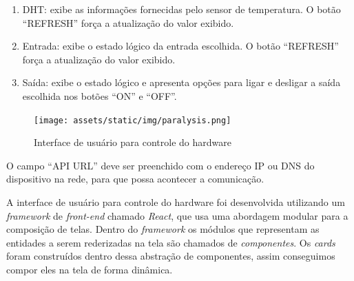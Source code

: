 \documentclass[../../layout.tex]{subfiles}
\begin{document}
\begin{enumerate}[label=\alph*)]
\itemsep0em
	\item DHT: exibe as informações fornecidas pelo sensor de temperatura. O botão ``REFRESH'' força a atualização do valor exibido.
	\item Entrada: exibe o estado lógico da entrada escolhida. O botão ``REFRESH'' força a atualização do valor exibido.
	\item Saída: exibe o estado lógico e apresenta opções para ligar e desligar a saída escolhida nos botões ``ON'' e ``OFF''.
\end{enumerate}

\begin{figure}[H]
\centering
\caption{Interface de usuário para controle do hardware}
\texttt{[image: assets/static/img/paralysis.png]}
\label{fig:ui}

\begin{minipage}{0.5\textwidth}
\end{minipage}
\end{figure}

O campo ``API URL'' deve ser preenchido com o endereço IP ou DNS do dispositivo na rede, para que possa acontecer a comunicação.

A interface de usuário para controle do hardware foi desenvolvida utilizando um \emph{framework} de \emph{front-end} chamado \emph{React}, que usa uma abordagem modular para a composição de telas.
Dentro do \emph{framework} os módulos que representam as entidades a serem rederizadas na tela são chamados de \emph{componentes}. Os \emph{cards} foram construídos dentro dessa abstração de componentes, assim conseguimos compor eles na tela de forma dinâmica.
\end{document}
